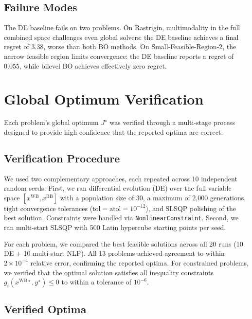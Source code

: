\documentclass[12pt,a4paper]{article}%
\theoremstyle{plain}%
\theoremstyle{remark}%
\theoremstyle{definition}%
\def\WB{\mathrm{WB}}
\def\BB{\mathrm{BB}}
\begin{document}
\begin{appendices}
\subsection{Failure Modes}\label{subsec:de_failures}

The DE baseline fails on two problems. On Rastrigin, multimodality in the full combined space challenges even global solvers: the DE baseline achieves a final regret of 3.38, worse than both BO methods. On Small-Feasible-Region-2, the narrow feasible region limits convergence: the DE baseline reports a regret of 0.055, while bilevel BO achieves effectively zero regret.

\section{Global Optimum Verification}\label{sec:optimum_verification}

Each problem's global optimum $J^\star$ was verified through a multi-stage process designed to provide high confidence that the reported optima are correct.

\subsection{Verification Procedure}\label{subsec:verification_procedure}

We used two complementary approaches, each repeated across 10 independent random seeds. First, we ran differential evolution (DE) over the full variable space $[x^{\WB}, x^{\BB}]$ with a population size of 30, a maximum of 2{,}000 generations, tight convergence tolerances ($\text{tol} = \text{atol} = 10^{-12}$), and SLSQP polishing of the best solution. Constraints were handled via \texttt{NonlinearConstraint}. Second, we ran multi-start SLSQP with 500 Latin hypercube starting points per seed.

For each problem, we compared the best feasible solutions across all 20 runs (10 DE + 10 multi-start NLP). All 13 problems achieved agreement to within $2 \times 10^{-4}$ relative error, confirming the reported optima. For constrained problems, we verified that the optimal solution satisfies all inequality constraints $g_i(x^{\WB\star}, y^\star) \leq 0$ to within a tolerance of $10^{-6}$.

\subsection{Verified Optima}\label{subsec:verified_optima}


\end{appendices}
\end{document}

